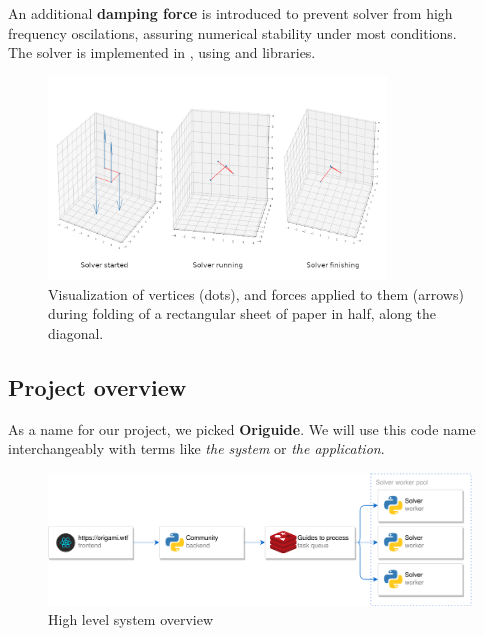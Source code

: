An additional \textbf{damping force} is introduced to prevent solver from
high frequency oscilations, assuring numerical stability under most conditions.\\

The solver is implemented in , using  and  libraries. 


\begin{figure}[H]
	\caption{Visualization of vertices (dots), and forces applied to them (arrows)
	during folding of a rectangular sheet of paper in half, along the diagonal. }
  \centering
    \includegraphics[width=0.8\textwidth]{assets/prototype-backend.png}
\end{figure}


\subsection{Project overview}

As a name for our project, we picked \textbf{Origuide}.
We will use this code name interchangeably with terms like \textit{the system} or \textit{the application}.
\smallskip

\begin{figure}[H]
	\caption{High level system overview}
  \centering
    \includegraphics[width=\textwidth]{assets/architecture.png}
\end{figure}

